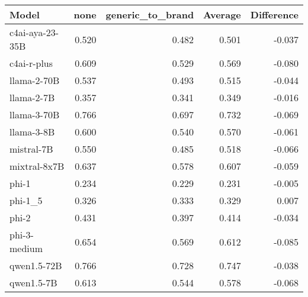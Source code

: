 \begin{tabular}{lrrrr}
\toprule
Model & none & generic_to_brand & Average & Difference \\
\midrule
c4ai-aya-23-35B & 0.520 & 0.482 & 0.501 & -0.037 \\
c4ai-r-plus & 0.609 & 0.529 & 0.569 & -0.080 \\
llama-2-70B & 0.537 & 0.493 & 0.515 & -0.044 \\
llama-2-7B & 0.357 & 0.341 & 0.349 & -0.016 \\
llama-3-70B & 0.766 & 0.697 & 0.732 & -0.069 \\
llama-3-8B & 0.600 & 0.540 & 0.570 & -0.061 \\
mistral-7B & 0.550 & 0.485 & 0.518 & -0.066 \\
mixtral-8x7B & 0.637 & 0.578 & 0.607 & -0.059 \\
phi-1 & 0.234 & 0.229 & 0.231 & -0.005 \\
phi-1_5 & 0.326 & 0.333 & 0.329 & 0.007 \\
phi-2 & 0.431 & 0.397 & 0.414 & -0.034 \\
phi-3-medium & 0.654 & 0.569 & 0.612 & -0.085 \\
qwen1.5-72B & 0.766 & 0.728 & 0.747 & -0.038 \\
qwen1.5-7B & 0.613 & 0.544 & 0.578 & -0.068 \\
\bottomrule
\end{tabular}
